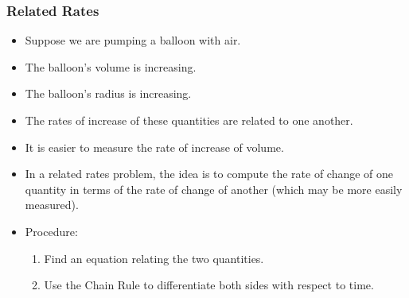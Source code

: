 \begin{frame}
\frametitle{Related Rates}
\begin{itemize}
\item  Suppose we are pumping a balloon with air.
\item  The balloon's volume is increasing.
\item  The balloon's radius is increasing.
\item  The rates of increase of these quantities are related to one another.
\item<2->  It is easier to measure the rate of increase of volume.
\item<3->  In a related rates problem, the idea is to compute the rate of change of one quantity in terms of the rate of change of another (which may be more easily measured).
\item<4->  Procedure:
\begin{enumerate}
\item<4->  Find an equation relating the two quantities.
\item<4->  Use the Chain Rule to differentiate both sides with respect to time.
\end{enumerate}
\end{itemize}
\end{frame}
